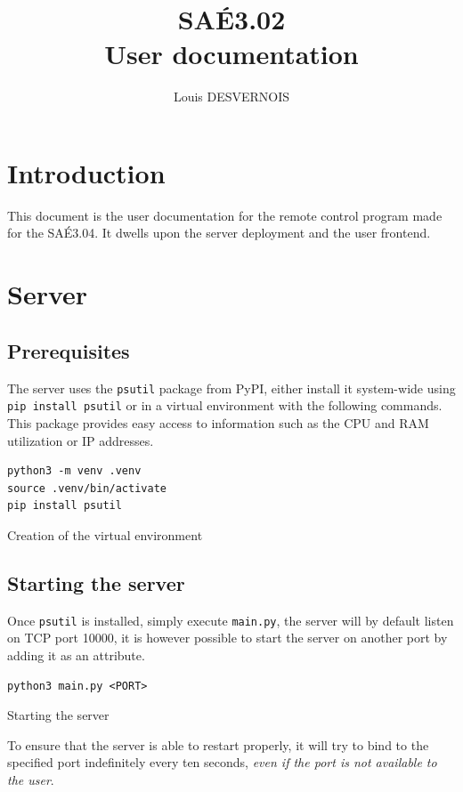 \documentclass{article}
\author{Louis DESVERNOIS}
\title{%
    SAÉ3.02 \\
    \large User documentation}
\begin{document}
\maketitle
\tableofcontents
\listoffigures
\listoflistings

\newpage
\section{Introduction}
This document is the user documentation for the remote control program made for
the SAÉ3.04. It dwells upon the server deployment and the user frontend.

\section{Server}
\subsection{Prerequisites}
The server uses the \verb|psutil| package from PyPI, either install it
system-wide using \verb|pip install psutil| or in a virtual environment with the
following commands. This package provides easy access to information such as the
CPU and RAM utilization or IP addresses.

\begin{listing}[H]
    \begin{verbatim}
python3 -m venv .venv
source .venv/bin/activate
pip install psutil
    \end{verbatim}
    \caption{Creation of the virtual environment}
    \label{venv:creation}
\end{listing}

\subsection{Starting the server}
Once \verb|psutil| is installed, simply execute \verb|main.py|, the server will
by default listen on TCP port 10000, it is however possible to start the server
on another port by adding it as an attribute.

\begin{listing}[H]
    \begin{verbatim}
python3 main.py <PORT>
    \end{verbatim}
    \caption{Starting the server}
    \label{venv:startingserver}
\end{listing}

To ensure that the server is able to restart properly, it will try to bind to
the specified port indefinitely every ten seconds, \emph{even if the port is not
available to the user}.
\end{document}
